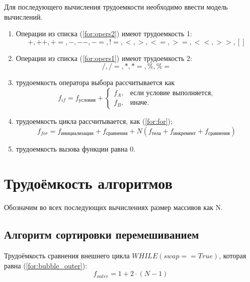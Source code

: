 Для последующего вычисления трудоемкости необходимо ввести модель вычислений.
\begin{enumerate}
	\item Операции из списка (\ref{for:opers2}) имеют трудоемкость 1:
	\begin{equation}
		\label{for:opers2}
		+, ++, +=, -, {-}-, -=, !=, <, >, <=, >=, <<, >>, []
	\end{equation}
	\item Операции из списка (\ref{for:opers1}) имеют трудоемкость 2:
	\begin{equation}
		\label{for:opers1}
		/, /=, *, *= ,\%, \%=
	\end{equation}
	\item трудоемкость оператора выбора  рассчитывается как
	\begin{equation}
		\label{for:if}
		f_{if} = f_{\text{условия}} +
		\begin{cases}
			f_A, & \text{если условие выполняется,}\\
			f_B, & \text{иначе.}
		\end{cases}
	\end{equation}
	\item трудоемкость цикла рассчитывается, как (\ref{for:for});
	\begin{equation}
		\label{for:for}
		f_{for} = f_{\text{инициализации}} + f_{\text{сравнения}} + N(f_{\text{тела}} + f_{\text{инкремент}} + f_{\text{сравнения}})
	\end{equation}
	\item трудоемкость вызова функции равна 0.
\end{enumerate}

\section{Трудоёмкость алгоритмов}

Обозначим во всех последующих вычислениях размер массивов как N.

\subsection{Алгоритм сортировки перемешиванием}


Трудоёмкость сравнения внешнего цикла $WHILE(swap == True)$, которая равна (\ref{for:bubble_outer}):
\begin{equation}
	\label{for:bubble_outer}
	f_{outer} = 1 + 2 \cdot (N - 1)
\end{equation}

